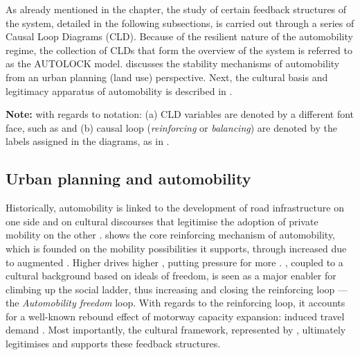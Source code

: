 As already mentioned in the  chapter, the study of certain feedback structures of the system, detailed in the following subsections, is carried out through a series of Causal Loop Diagrams (CLD). Because of the resilient nature of the automobility regime, the collection of CLDs that form the overview of the system is referred to as the AUTOLOCK model.  discusses the stability mechanisms of automobility from an urban planning (land use) perspective. Next, the cultural basis and legitimacy apparatus of automobility is described in .

\textbf{Note:} with regards to notation: (a) CLD variables are denoted by a different font face, such as  and (b) causal loop (\emph{reinforcing} or \emph{balancing}) are denoted by the labels assigned in the diagrams, as in .


\subsection{Urban planning and automobility}
\label{ss:results:cld_urban-planning}
Historically, automobility is linked to the development of road infrastructure on one side and on cultural discourses that legitimise the adoption of private mobility on the other \parencite{goodwin2012_ProvidingRoadCapacity,gartman2004_ThreeAgesAutomobile,sheller2012_EmergenceNewCultures}.  shows the core reinforcing mechanism of automobility, which is founded on the mobility possibilities it supports, through increased  due to augmented . Higher  drives higher , putting pressure for more . , coupled to a cultural background based on ideals of freedom, is seen as a major enabler for climbing up the social ladder, thus increasing  and closing the  reinforcing loop --- the \emph{Automobility freedom} loop. With regards to the  reinforcing loop, it accounts for a well-known rebound effect of motorway capacity expansion: induced travel demand \parencite{hymel2010_Induceddemandrebound,thill2005_Tripmakinginduced}. Most importantly, the cultural framework, represented by , ultimately legitimises and supports these feedback structures.


